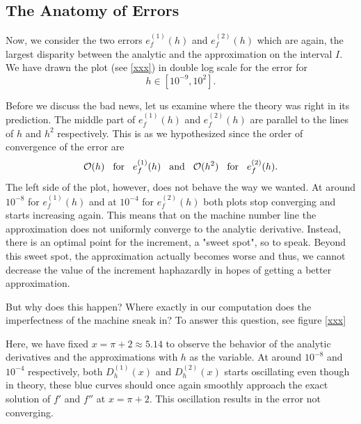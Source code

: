 \subsection{The Anatomy of Errors}

Now, we consider the two errors \(e_f^{(1)}(h)\) and \(e_f^{(2)}(h)\) which are again, the largest disparity between the analytic and the approximation on the interval \(I\). We have drawn the plot (see \ref{xxx}) in double log scale for the error for
\[h \in [10^{-9}, 10^2] \text{.} \]


Before we discuss the bad news, let us examine where the theory was right in its prediction. The middle part of \(e_f^{(1)}(h)\) and \(e_f^{(2)}(h)\) are parallel to the lines of \(h\) and \(h^2\) respectively. This is as we hypothesized since the order of convergence of the error are
\[\mathcal{O}(h) \hspace{0.3cm} \text{for} \hspace{0.3cm} e_f^{(1)}(h) \hspace{0.3cm} \text{and} \hspace{0.3cm} \mathcal{O}(h^2) \hspace{0.3cm} \text{for} \hspace{0.3cm} e_f^{(2)}(h) \text{.}\]
The left side of the plot, however, does not behave the way we wanted. At around \(10^{-8}\) for \(e_f^{(1)}(h)\) and at \(10^{-4}\) for \(e_f^{(2)}(h)\) both plots stop converging and starts increasing again. This means that on the machine number line the approximation does not uniformly converge to the analytic derivative. Instead, there is an optimal point for the increment, a "sweet spot", so to speak. Beyond this sweet spot, the approximation actually becomes worse and thus, we cannot decrease the value of the increment haphazardly in hopes of getting a better approximation.

But why does this happen? Where exactly in our computation does the imperfectness of the machine sneak in? To answer this question, see figure \ref{xxx}


Here, we have fixed \(x = \pi + 2 \approx 5.14\) to observe the behavior of the analytic derivatives and the approximations with \(h\) as the variable. At around \(10^{-8}\) and \(10^{-4}\) respectively, both \(D^{(1)}_h(x)\) and \(D^{(2)}_h(x)\) starts oscillating even though in theory, these blue curves should once again smoothly approach the exact solution of \(f'\) and \(f''\) at \(x = \pi + 2\). This oscillation results in the error not converging.

